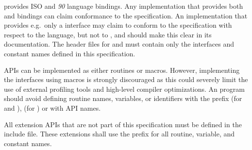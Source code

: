 \openshmem provides ISO \Clang and \Fortran \textit{90} language bindings.
Any implementation that provides both \Clang and \Fortran bindings can claim
conformance to the specification. An implementation that provides e.g.\ only a
\Clang interface may claim to conform to the \openshmem specification with
respect to the \Clang language, but not to \Fortran, and should make this
clear in its documentation. The \openshmem header files for \Clang and
\Fortran must contain only the interfaces and constant names defined in this
specification.

\openshmem \ac{API}s can be implemented as either routines or macros. However,
implementing the interfaces using macros is strongly discouraged as this could
severely limit the use of external profiling tools and high-level compiler
optimizations. An \openshmem program should avoid defining routine names,
variables, or identifiers with the prefix \shmemprefix (for \Clang and
\Fortran), \shmemprefixC (for \Clang) or with \openshmem \ac{API} names.

All \openshmem extension \ac{API}s that are not part of this specification must
be defined in the  include file. These extensions shall use the
 prefix for all routine, variable, and constant names.
